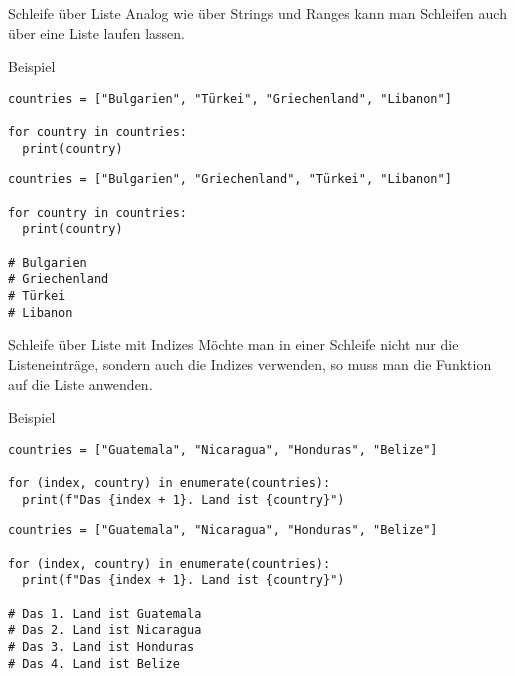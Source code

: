 \begin{fragile}
\begin{block}{Schleife über Liste}
\vspace{2pt}
Analog wie über Strings und Ranges kann man Schleifen auch über eine Liste laufen lassen.  
\end{block}
\vspace{12pt}
\pause 

\begin{exampleblock}{Beispiel}
\vspace{2pt}
\begin{overprint}
\begin{verbatim}
countries = ["Bulgarien", "Türkei", "Griechenland", "Libanon"]

for country in countries:
  print(country)
\end{verbatim}
\begin{verbatim}
countries = ["Bulgarien", "Griechenland", "Türkei", "Libanon"]

for country in countries:
  print(country)
  
# Bulgarien
# Griechenland
# Türkei
# Libanon
\end{verbatim}
\end{overprint}
\end{exampleblock}
\end{fragile}


\begin{fragile}
\begin{block}{Schleife über Liste mit Indizes}
\vspace{2pt}
Möchte man in einer Schleife nicht nur die Listeneinträge, sondern auch die Indizes verwenden, so muss man die Funktion  auf die Liste anwenden. 
\end{block}
\vspace{12pt}
\pause 

\begin{exampleblock}{Beispiel}
\vspace{2pt}
\begin{overprint}
\begin{verbatim}
countries = ["Guatemala", "Nicaragua", "Honduras", "Belize"]

for (index, country) in enumerate(countries):
  print(f"Das {index + 1}. Land ist {country}")
\end{verbatim}
\begin{verbatim}
countries = ["Guatemala", "Nicaragua", "Honduras", "Belize"]

for (index, country) in enumerate(countries):
  print(f"Das {index + 1}. Land ist {country}")

# Das 1. Land ist Guatemala
# Das 2. Land ist Nicaragua
# Das 3. Land ist Honduras
# Das 4. Land ist Belize
\end{verbatim}
\end{overprint}
\end{exampleblock}
\end{fragile}


